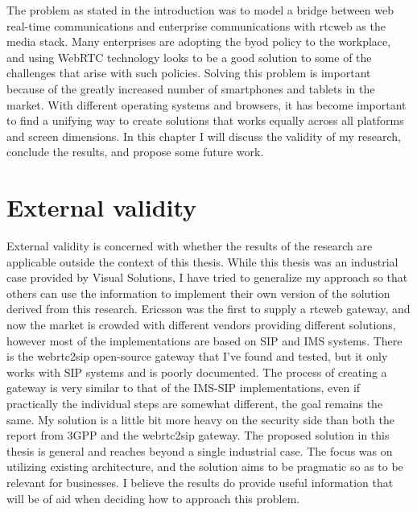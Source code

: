 

The problem as stated in the introduction was to model a bridge between web real-time communications and enterprise communications with \gls{rtcweb} as the media stack. Many enterprises are adopting the \gls{byod} policy to the workplace, and using WebRTC technology looks to be a good solution to some of the challenges that arise with such policies. Solving this problem is important because of the greatly increased number of smartphones and tablets in the market. With different operating systems and browsers, it has become important to find a unifying way to create solutions that works equally across all platforms and screen dimensions. In this chapter I will discuss the validity of my research, conclude the results, and propose some future work.


\section{External validity}
External validity is concerned with whether the results of the research are applicable outside the context of this thesis. While this thesis was an industrial case provided by Visual Solutions, I have tried to generalize my approach so that others can use the information to implement their own version of the solution derived from this research. Ericsson was the first to supply a \gls{rtcweb} gateway, and now the market is crowded with different vendors providing different solutions, however most of the implementations are based on SIP and IMS systems. There is the webrtc2sip open-source gateway that I've found and tested, but it only works with SIP systems and is poorly documented. The process of creating a gateway is very similar to that of the IMS-SIP implementations, even if practically the individual steps are somewhat different, the goal remains the same. My solution is a little bit more heavy on the security side than both the report from 3GPP\cite{3gpp-wrtc-access-ims} and the webrtc2sip gateway. The proposed solution in this thesis is general and reaches beyond a single industrial case. The focus was on utilizing existing architecture, and the solution aims to be pragmatic so as to be relevant for businesses. I believe the results do provide useful information that will be of aid when deciding how to approach this problem.


